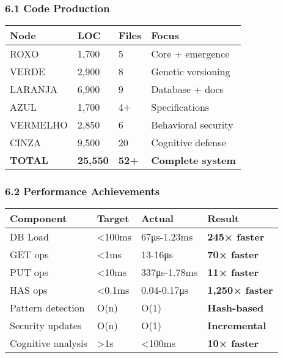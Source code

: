 \documentclass[
]{article}
\begin{document}
\subsubsection{6.1 Code Production}\label{code-production}

{\def\LTcaptype{} %
\begin{longtable}[]{@{}llll@{}}
\toprule\noalign{}
Node & LOC & Files & Focus \\
\midrule\noalign{}
\endhead
\bottomrule\noalign{}
\endlastfoot
ROXO & 1,700 & 5 & Core + emergence \\
VERDE & 2,900 & 8 & Genetic versioning \\
LARANJA & 6,900 & 9 & Database + docs \\
AZUL & 1,700 & 4+ & Specifications \\
VERMELHO & 2,850 & 6 & Behavioral security \\
CINZA & 9,500 & 20 & Cognitive defense \\
\textbf{TOTAL} & \textbf{25,550} & \textbf{52+} & \textbf{Complete
system} \\
\end{longtable}
}

\subsubsection{6.2 Performance
Achievements}\label{performance-achievements}

{\def\LTcaptype{} %
\begin{longtable}[]{@{}llll@{}}
\toprule\noalign{}
Component & Target & Actual & Result \\
\midrule\noalign{}
\endhead
\bottomrule\noalign{}
\endlastfoot
DB Load & \textless100ms & 67μs-1.23ms & \textbf{245× faster} \\
GET ops & \textless1ms & 13-16μs & \textbf{70× faster} \\
PUT ops & \textless10ms & 337μs-1.78ms & \textbf{11× faster} \\
HAS ops & \textless0.1ms & 0.04-0.17μs & \textbf{1,250× faster} \\
Pattern detection & O(n) & O(1) & \textbf{Hash-based} \\
Security updates & O(n) & O(1) & \textbf{Incremental} \\
Cognitive analysis & \textgreater1s & \textless100ms & \textbf{10×
faster} \\
\end{longtable}
}
\end{document}
